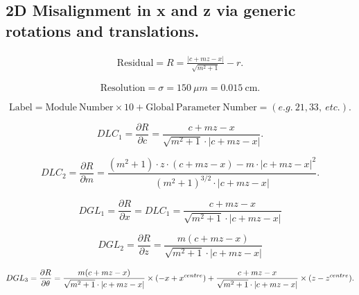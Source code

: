 \documentclass[a4paper,11pt]{article}
\begin{document}
\subsection{2D Misalignment in x and z via generic rotations and translations.}

\begin{equation}
\begin{split}
\mathrm{Residual} = R =\frac{ |c+mz-x| }  { \sqrt{m^2+1} } -r.
\end{split}
\end{equation}

\begin{equation}	
\mathrm{Resolution} = \sigma = 150 \ \mu m = 0.015 \ \mathrm{cm}.
\end{equation}

\begin{equation}	
\mathrm{Label}= \mathrm{Module \ Number} \times 10 + \mathrm{Global \ Parameter \ Number} = (e.g. \ 21, 33, \ etc.).
\end{equation}

\begin{equation}
DLC_1 = \frac{\partial R}{\partial c} = \frac{ c+mz-x }  { \sqrt{m^2+1} \cdot |c+mz-x| }.
\end{equation}

\begin{equation}
DLC_2 = \frac{ \partial R}{\partial m} = \frac{ (m^2+1)\cdot z\cdot(c+mz-x) - m\cdot |c+mz-x|^2 }{ (m^2+1)^{3/2} \cdot |c+mz-x|  }.
\end{equation}

\begin{equation}	
DGL_1 = \frac{\partial R}{\partial x} = DLC_1 = \frac{ c+mz-x }  { \sqrt{m^2+1} \cdot |c+mz-x| }
\end{equation}

\begin{equation}	
DGL_2 = \frac{\partial R}{\partial z} = \frac{ m(c+mz-x) }  { \sqrt{m^2+1} \cdot |c+mz-x| }
\end{equation}

\begin{equation}	
DGL_3 = \frac{\partial R}{\partial\theta} = 
\frac{ m(c+mz-x) }  { \sqrt{m^2+1} \cdot |c+mz-x| } \times (-x + x^{centre}) + \\ \frac{ c+mz-x }  { \sqrt{m^2+1} \cdot |c+mz-x| } \times (z - z^{centre}).
\end{equation}

\clearpage


\nocite{*}
\thispagestyle{plain}

\end{document}
